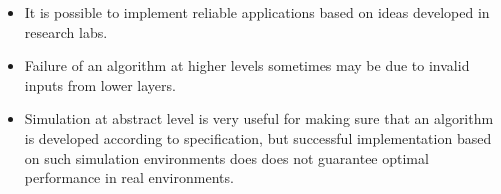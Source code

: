 \begin{itemize}
\item It is possible to implement reliable applications based on ideas developed in research labs. 
\item Failure of an algorithm at higher levels sometimes may be due to invalid inputs from lower layers.
\item Simulation at abstract level is very useful for making sure that an algorithm is developed according to specification, but successful implementation based on such simulation environments does does not guarantee optimal performance in real environments.
\end{itemize}
